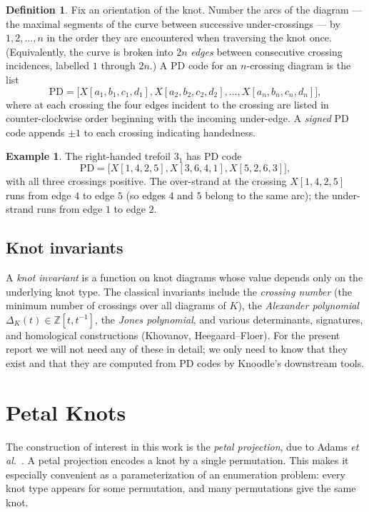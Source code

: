 \documentclass[11pt,oneside]{report}
\theoremstyle{definition}
\newtheorem{definition}[theorem]{Definition}
\newtheorem{example}[theorem]{Example}
\newcommand{\Z}{\mathbb{Z}}
\newcommand{\PD}{\mathrm{PD}}
\begin{document}
\begin{definition}\label{def:pdcode}
Fix an orientation of the knot. Number the arcs of the diagram --- the maximal
segments of the curve between successive under-crossings --- by $1, 2, \dots, n$
in the order they are encountered when traversing the knot once. (Equivalently,
the curve is broken into $2n$ \emph{edges} between consecutive crossing
incidences, labelled $1$ through $2n$.) A PD code for an $n$-crossing diagram
is the list
\[
\PD = \bigl[ X[a_1,b_1,c_1,d_1], X[a_2,b_2,c_2,d_2], \dots, X[a_n,b_n,c_n,d_n] \bigr],
\]
where at each crossing the four edges incident to the crossing are listed in
counter-clockwise order beginning with the incoming under-edge. A
\emph{signed} PD code appends $\pm 1$ to each crossing indicating handedness.
\end{definition}

\begin{example}\label{ex:trefoilpd}
The right-handed trefoil $3_1$ has PD code
\[
\PD = \bigl[ X[1,4,2,5], X[3,6,4,1], X[5,2,6,3] \bigr],
\]
with all three crossings positive. The over-strand at the crossing $X[1,4,2,5]$
runs from edge $4$ to edge $5$ (so edges $4$ and $5$ belong to the same arc);
the under-strand runs from edge $1$ to edge $2$.
\end{example}

\section{Knot invariants}

A \emph{knot invariant} is a function on knot diagrams whose value depends only
on the underlying knot type. The classical invariants include the
\emph{crossing number} (the minimum number of crossings over all diagrams of
$K$), the \emph{Alexander polynomial} $\Delta_K(t) \in \Z[t,t^{-1}]$, the
\emph{Jones polynomial}, and various determinants, signatures, and
homological constructions (Khovanov, Heegaard--Floer). For the present
report we will not need any of these in detail; we only need to know that
they exist and that they are computed from PD codes by Knoodle's downstream
tools.

\chapter{Petal Knots}\label{chap:petal}

The construction of interest in this work is the \emph{petal projection}, due
to Adams \emph{et al.}~\cite{Adams}. A petal projection encodes a knot by a
single permutation. This makes it especially convenient as a parameterization
of an enumeration problem: every knot type appears for some permutation, and
many permutations give the same knot.
\end{document}
